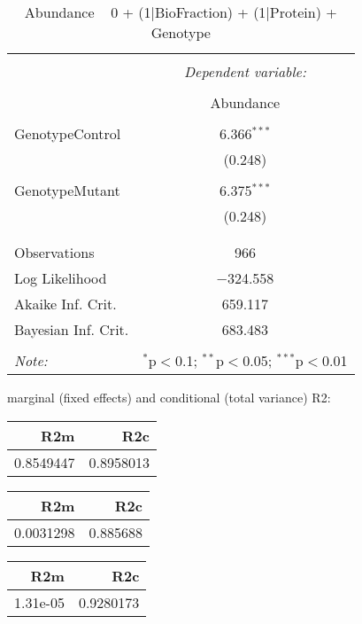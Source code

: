 \documentclass[11pt]{report}
\begin{document}
\begin{table}[!htbp] \centering 
  \caption{Abundance ~ 0 + (1|BioFraction) + (1|Protein) + Genotype} 
  \label{} 
\begin{tabular}{@{\extracolsep{5pt}}lc} 
\\[-1.8ex]\hline 
\hline \\[-1.8ex] 
 & \multicolumn{1}{c}{\textit{Dependent variable:}} \\ 
\cline{2-2} 
\\[-1.8ex] & Abundance \\ 
\hline \\[-1.8ex] 
 GenotypeControl & 6.366$^{***}$ \\ 
  & (0.248) \\ 
  & \\ 
 GenotypeMutant & 6.375$^{***}$ \\ 
  & (0.248) \\ 
  & \\ 
\hline \\[-1.8ex] 
Observations & 966 \\ 
Log Likelihood & $-$324.558 \\ 
Akaike Inf. Crit. & 659.117 \\ 
Bayesian Inf. Crit. & 683.483 \\ 
\hline 
\hline \\[-1.8ex] 
\textit{Note:}  & \multicolumn{1}{r}{$^{*}$p$<$0.1; $^{**}$p$<$0.05; $^{***}$p$<$0.01} \\ 
\end{tabular} 
\end{table} 
marginal (fixed effects) and conditional (total variance) R2:

\begin{tabular}{r|r}
\hline
R2m & R2c\\
\hline
0.8549447 & 0.8958013\\
\hline
\end{tabular}

\begin{tabular}{r|r}
\hline
R2m & R2c\\
\hline
0.0031298 & 0.885688\\
\hline
\end{tabular}

\begin{tabular}{r|r}
\hline
R2m & R2c\\
\hline
1.31e-05 & 0.9280173\\
\hline
\end{tabular}
\end{document}
